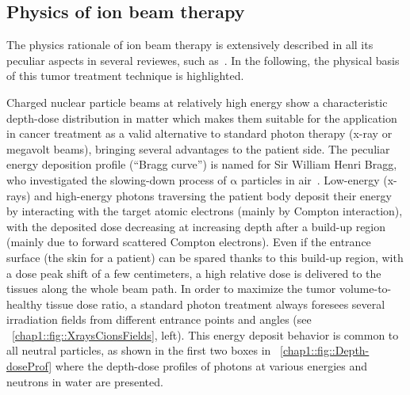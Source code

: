 \subsection{Physics of ion beam therapy}\label{chap1::subsec::Physics}
The physics rationale of ion beam therapy is extensively described in all its peculiar aspects in several reviewes, such as~\cite{Lomax2009, Belkic2010, Schardt2010, Bichsel2013, Nupecc2014,  Newhauser2015, Durante2016}. In the following, the physical basis of this tumor treatment technique is highlighted.
 
Charged nuclear particle beams at relatively high energy show a characteristic depth-dose distribution in matter which makes them suitable for the application in cancer treatment as a valid alternative to standard photon therapy (x-ray or megavolt beams), bringing several advantages to the patient side. The peculiar energy deposition profile (\enquote{Bragg curve}) is named for Sir William Henri Bragg, who investigated the slowing-down process of $\mathrm{\alpha}$ particles in air~\parencite{Bragg1904, Bragg1905}. 
Low-energy (x-rays) and high-energy photons traversing the patient body deposit their energy by interacting with the target atomic electrons (mainly by Compton interaction), with the deposited dose decreasing at increasing depth after a build-up region (mainly due to forward scattered Compton electrons). Even if the entrance surface (the skin for a patient) can be spared thanks to this build-up region, with a dose peak shift of a few centimeters, a high relative dose is delivered to the tissues along the whole beam path. In order to maximize the tumor volume-to-healthy tissue dose ratio, a standard photon treatment always foresees several irradiation fields from different entrance points and angles (see \figurename~\ref{chap1::fig::XraysCionsFields}, left). This energy deposit behavior is common to all neutral particles, as shown in the first two boxes in \figurename~\ref{chap1::fig::Depth-doseProf} where the depth-dose profiles of photons at various energies and neutrons in water are presented. 
